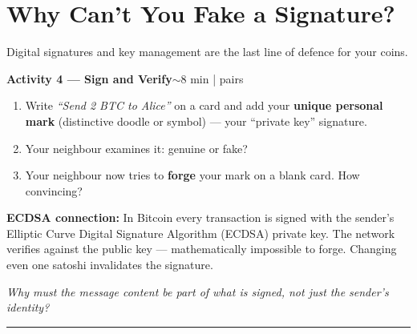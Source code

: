 \documentclass[11pt,a4paper]{article}
\newcommand{\activitybox}[3]{%
  \noindent\colorbox{mllavender4}{\parbox{\dimexpr\linewidth-2\fboxsep}{%
    \textbf{\color{mlpurple}#1}\hfill\textcolor{mlgray}{\small #2}\\[2pt]#3%
  }}\par\vspace{4pt}%
}
\begin{document}
\newpage


\section*{\color{mlpurple}Why Can't You Fake a Signature?}

\vspace{-2pt}
\noindent\textcolor{mlgray}{\small Digital signatures and key management are the last line of defence
for your coins.}
\vspace{4pt}

\activitybox{Activity 4 --- Sign and Verify}{$\sim$8 min | pairs}{%
\begin{enumerate}
  \item Write \textit{``Send 2 BTC to Alice''} on a card and add your \textbf{unique personal mark}
        (distinctive doodle or symbol) --- your ``private key'' signature.
  \item Your neighbour examines it: genuine or fake?
  \item Your neighbour now tries to \textbf{forge} your mark on a blank card. How convincing?
\end{enumerate}

\textbf{ECDSA connection:} In Bitcoin every transaction is signed with the sender's
Elliptic Curve Digital Signature Algorithm (ECDSA) private key. The network verifies against the
public key --- mathematically impossible to forge. Changing even one satoshi invalidates the
signature.

\vspace{3pt}
\textit{Why must the message content be part of what is signed, not just the sender's identity?}
\vspace{4pt}
\noindent\rule{\linewidth}{0.3pt}
}

\vspace{2pt}
\end{document}
